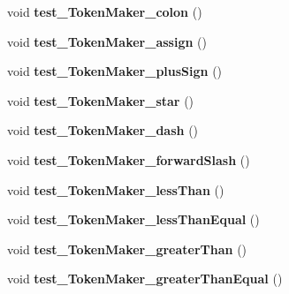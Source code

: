 \begin{DoxyCompactItemize}
\item 
\hypertarget{classScannerTestSuite_af98d5f5c61439723d0cb18f9357d91d8}{void {\bfseries test\-\_\-\-Token\-Maker\-\_\-colon} ()}\label{classScannerTestSuite_af98d5f5c61439723d0cb18f9357d91d8}

\item 
\hypertarget{classScannerTestSuite_aa04a5770dba31012dd42409eebbf0eb8}{void {\bfseries test\-\_\-\-Token\-Maker\-\_\-assign} ()}\label{classScannerTestSuite_aa04a5770dba31012dd42409eebbf0eb8}

\item 
\hypertarget{classScannerTestSuite_ad65fde16b4a37ce6686bbc29b0e42f07}{void {\bfseries test\-\_\-\-Token\-Maker\-\_\-plus\-Sign} ()}\label{classScannerTestSuite_ad65fde16b4a37ce6686bbc29b0e42f07}

\item 
\hypertarget{classScannerTestSuite_af0977bb3ca5ca5954bc787c31b041649}{void {\bfseries test\-\_\-\-Token\-Maker\-\_\-star} ()}\label{classScannerTestSuite_af0977bb3ca5ca5954bc787c31b041649}

\item 
\hypertarget{classScannerTestSuite_a348c6d799fb438215ee94891328f95eb}{void {\bfseries test\-\_\-\-Token\-Maker\-\_\-dash} ()}\label{classScannerTestSuite_a348c6d799fb438215ee94891328f95eb}

\item 
\hypertarget{classScannerTestSuite_a25f1d1c73ad5b607613a34bd5d5c3238}{void {\bfseries test\-\_\-\-Token\-Maker\-\_\-forward\-Slash} ()}\label{classScannerTestSuite_a25f1d1c73ad5b607613a34bd5d5c3238}

\item 
\hypertarget{classScannerTestSuite_afc7124c00488adc7635905290e1159e6}{void {\bfseries test\-\_\-\-Token\-Maker\-\_\-less\-Than} ()}\label{classScannerTestSuite_afc7124c00488adc7635905290e1159e6}

\item 
\hypertarget{classScannerTestSuite_a2b2720fe2932b4db758df6c67e1bef14}{void {\bfseries test\-\_\-\-Token\-Maker\-\_\-less\-Than\-Equal} ()}\label{classScannerTestSuite_a2b2720fe2932b4db758df6c67e1bef14}

\item 
\hypertarget{classScannerTestSuite_a2d3ebde4e350cb1ee4ee8c53c54bf0a0}{void {\bfseries test\-\_\-\-Token\-Maker\-\_\-greater\-Than} ()}\label{classScannerTestSuite_a2d3ebde4e350cb1ee4ee8c53c54bf0a0}

\item 
\hypertarget{classScannerTestSuite_a9805d181580e4b7fafa00b0beaf53a32}{void {\bfseries test\-\_\-\-Token\-Maker\-\_\-greater\-Than\-Equal} ()}\label{classScannerTestSuite_a9805d181580e4b7fafa00b0beaf53a32}


\end{DoxyCompactItemize}
